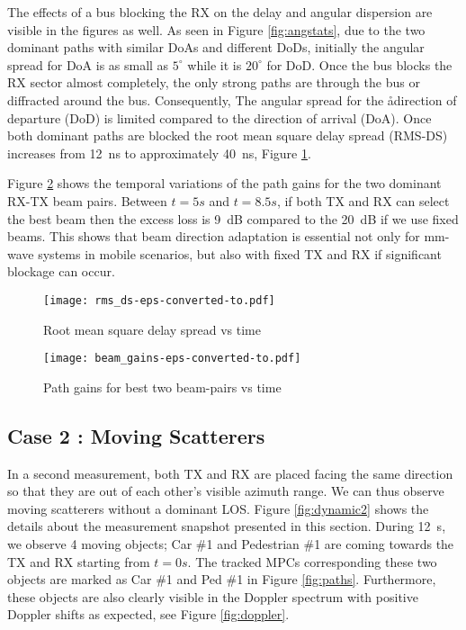 \documentclass[conference]{IEEEtran}
\begin{document}
The effects of a bus blocking the RX on the delay and angular dispersion are visible in the figures as well. As seen in Figure \ref{fig:angstats}, due to the two dominant paths with similar DoAs and different DoDs, initially the angular spread for DoA is as small as $5^\circ$ while it is $20^\circ$ for DoD. Once the bus blocks the RX sector almost completely, the only strong paths are through the bus or diffracted around the bus. Consequently, The angular spread for the ådirection of departure (DoD) is limited compared to the direction of arrival (DoA). Once both dominant paths are blocked the root mean square delay spread (RMS-DS) increases from \SI{12}{ns} to approximately \SI{40}{ns}, Figure \ref{fig:rms_ds}.

Figure \ref{fig:beam_gains} shows the temporal variations of the path gains for the two dominant RX-TX beam pairs. Between $t=5s$ and $t=8.5s$, if both TX and RX can select the best beam then the excess loss is \SI{9}{dB} compared to the \SI{20}{dB} if we use fixed beams. This shows that beam direction adaptation is essential not only for  mm-wave systems in mobile scenarios, but also with fixed TX and RX if significant blockage can occur. 



\begin{figure}[tbp]
        \centering\texttt{[image: rms\_ds-eps-converted-to.pdf]}\caption{Root mean square delay spread vs time}\label{fig:rms_ds}
\end{figure}


\begin{figure}[tbp]
        \centering\texttt{[image: beam\_gains-eps-converted-to.pdf]}\caption{Path gains for best two beam-pairs vs time}\label{fig:beam_gains}
\end{figure}




\subsection{Case 2 : Moving Scatterers}

In a second measurement, both TX and RX are placed facing the same direction so that they are out of each other's visible azimuth range. We can thus observe moving scatterers without a dominant LOS. Figure \ref{fig:dynamic2} shows the details about the measurement snapshot presented in this section. During \SI{12}{s}, we observe 4 moving objects; Car \#1 and Pedestrian \#1 are coming towards the TX and RX starting from $t=0s$. The tracked MPCs corresponding these two objects are marked as Car \#1 and Ped \#1 in Figure \ref{fig:paths}. Furthermore, these objects are also clearly visible in the Doppler spectrum with positive Doppler shifts as expected, see Figure \ref{fig:doppler}. 
\end{document}
